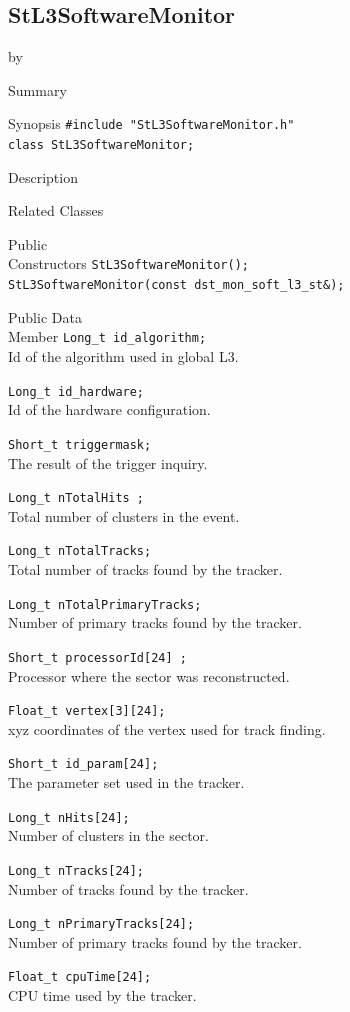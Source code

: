 \documentclass[twoside]{article}
\newcommand{\entrylabel}[1]{\mbox{\textbf{{#1}}}\hfil}%
\newenvironment{entry}
{\begin{list}{}%
    {\renewcommand{\makelabel}{\entrylabel}%
     \setlength{\labelwidth}{90pt}%
     \setlength{\leftmargin}{\labelwidth}
     \advance\leftmargin by \labelsep%
      }%
    }%
  {\end{list}}
\newcommand{\Entrylabel}[1]%
{\raisebox{0pt}[1ex][0pt]{\makebox[\labelwidth][l]%
    {\parbox[t]{\labelwidth}{\hspace{0pt}\textbf{{#1}}}}}}
\newenvironment{Entry}%
{\renewcommand{\entrylabel}{\Entrylabel}\begin{entry}}%
  {\end{entry}}
\begin{document}
\subsection{StL3SoftwareMonitor}
\label{sec:StL3SoftwareMonitor}
\begin{Entry}
\item[Summary]
\item[Synopsis]
    \verb+#include "StL3SoftwareMonitor.h"+\\
    \verb+class StL3SoftwareMonitor;+\\
\item[Description]
\item[Related Classes]
\item[Public\\ Constructors]
    \verb+StL3SoftwareMonitor();+\\
    \verb+StL3SoftwareMonitor(const dst_mon_soft_l3_st&);+\\
\item[Public Data\\ Member]
    \verb+Long_t id_algorithm;+\\
    Id of the algorithm used in global L3.
    
    \verb+Long_t id_hardware;+\\
    Id of the hardware configuration.
    
    \verb+Short_t triggermask;+\\
    The result of the trigger inquiry.
    
    \verb+Long_t nTotalHits ;+\\
    Total number of clusters in the event.
    
    \verb+Long_t nTotalTracks;+\\
    Total number of tracks found by the tracker.
    
    \verb+Long_t nTotalPrimaryTracks;+\\
    Number of primary tracks found by the tracker.
    
    \verb+Short_t processorId[24] ;+\\
    Processor where the sector was reconstructed.
    
    \verb+Float_t vertex[3][24];+\\
    xyz coordinates of the vertex used for track finding.
    
    \verb+Short_t id_param[24];+\\
    The parameter set used in the tracker.
    
    \verb+Long_t nHits[24];+\\
    Number of clusters in the sector.
    
    \verb+Long_t nTracks[24];+\\
    Number of tracks found by the tracker.
    
    \verb+Long_t nPrimaryTracks[24];+\\
    Number of primary tracks found by the tracker.
    
    \verb+Float_t cpuTime[24];+\\
    CPU time used by the tracker.
\end{Entry}
\clearpage
\end{document}
